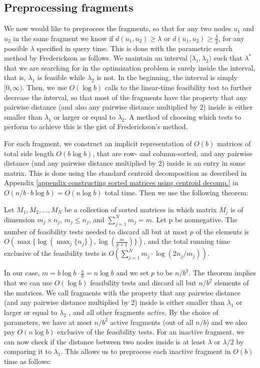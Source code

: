 \documentclass[a4paper,UKenglish]{lipics-v2016}
\theoremstyle{plain}
\begin{document}
\subsection{Preprocessing fragments} \label{Pre-Processing Fragments}
We now would like to preprocess the fragments, so that for any two nodes $u_{1}$ and $u_{2}$ in the same fragment we know
if $d(u_1,u_2)\geq\lambda$ or $d(u_1,u_2) \geq \frac{\lambda}{2}$, for any possible $\lambda$ specified in query time. 
This is done with the parametric search method by Frederickson as follows. We maintain an interval $[\lambda_1,\lambda_2)$ such that
$\lambda^{*}$ that we are searching for in the optimization problem is surely inside the interval, that is, $\lambda_{1}$ is feasible
while $\lambda_{2}$ is not. In the beginning, the interval is simply $[0,\infty)$. Then, we use $O(\log b)$ calls to the
linear-time feasibility test to further decrease the interval, so that most of the fragments have the property that any pairwise distance
(and also any pairwise distance multiplied by 2) inside is either smaller than $\lambda_{1}$ or larger or equal to $\lambda_{2}$.
A method of choosing which tests to perform to achieve this is the gist of Frederickson's method.

For each fragment, we construct an implicit representation of $O(b)$ matrices of total side length $O(b\log b)$, that are row- and column-sorted,
and any pairwise distance (and any pairwise distance multiplied by 2) inside is an entry in some matrix. This is done using the standard centroid 
decomposition as described in Appendix \ref{appendix constructing sorted matrices using centroid decomp.} in $O(n/b\cdot b\log b)=O(n\log b)$
total time. Then we use the following theorem:

\begin{theorem}\label{Frederickson's theorem}
Let  ${M_1, M_2, . . . , M_N}$ be a collection of sorted matrices in which matrix $M_j$ is of dimension $m_j \times n_j$, $m_j \leq n_j$, and $\sum_{j=1}^{N} m_j = m$.
Let p be nonnegative. The number of feasibility tests needed to discard all but at most $p$ of the elements is $O(\max \lbrace \log(\max_{j} \lbrace n_j \rbrace), \log(\frac{m}{p+1}) \rbrace)$, and the total running time exclusive of the feasibility tests is $O(\sum_{j=1}^{N} m_j \cdot \log (2n_j/m_j))$.
\end{theorem}
In our case, $m=b \log b \cdot \frac{n}{b} = n \log b$ and we set $p$ to be $n/b^2$. The theorem implies that we can use $O(\log b)$ feasibility tests and discard all but $n/b^2$ elements of the matrices.
We call fragments with the property that any pairwise distance (and any pairwise distance multiplied by 2) inside is either smaller than
$\lambda_{1}$ or larger or equal to $\lambda_{2}$ , and all other fragments \textit{active}.
By the choice of parameters, we have at most $n/b^{2}$ active fragments (out of all $n/b$) and we also pay $O(n \log b)$ exclusive of the feasibility tests.
For an inactive fragment, we can now check if the distance between two nodes inside is at least $\lambda$ or $\lambda/2$ by
comparing it to $\lambda_{1}$.
This allows us to preprocess each inactive fragment in $O(b)$ time as follows:
\end{document}
